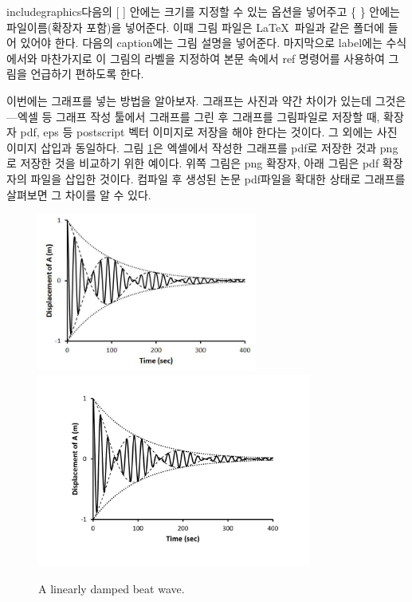 \documentclass[twoside,11pt]{gshs_thesis}
\begin{document}
includegraphics다음의 [ ] 안에는 크기를 지정할 수 있는 옵션을 넣어주고 \{ \} 안에는 파일이름(확장자 포함)을 넣어준다. 이때 그림 파일은 \LaTeX\ 파일과 같은 폴더에 들어 있어야 한다. 다음의 caption에는 그림 설명을 넣어준다. 마지막으로 label에는 수식에서와 마찬가지로 이 그림의 라벨을 지정하여 본문 속에서 ref 명령어를 사용하여 그림을 언급하기 편하도록 한다.

이번에는 그래프를 넣는 방법을 알아보자. 그래프는 사진과 약간 차이가 있는데 그것은---엑셀 등 그래프 작성 툴에서 그래프를 그린 후 그래프를 그림파일로 저장할 때, 확장자 pdf, eps 등 postscript 벡터 이미지로 저장을 해야 한다는 것이다. 그 외에는 사진 이미지 삽입과 동일하다. 그림 \ref{Fig01}은 엑셀에서 작성한 그래프를 pdf로 저장한 것과 png로 저장한 것을 비교하기 위한 예이다. 위쪽 그림은 png 확장자, 아래 그림은 pdf 확장자의 파일을 삽입한 것이다. 컴파일 후 생성된 논문 pdf파일을 확대한 상태로 그래프를 살펴보면 그 차이를 알 수 있다.


\begin{figure}[t]
\begin{center}
\includegraphics[width=7.2cm]{Figure01.png}\\
\includegraphics[width=9cm]{Figure01.pdf}
\caption{A linearly damped beat wave.} \label{Fig01}
\end{center}
\end{figure}
\end{document}
